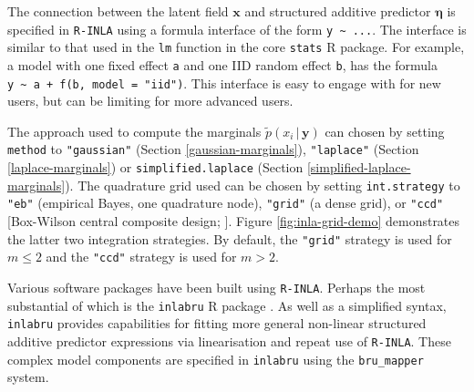 \documentclass[a4paper, nobind]{templates/ociamthesis}
\begin{document}
The connection between the latent field \(\mathbf{x}\) and structured additive predictor \(\boldsymbol{\mathbf{\eta}}\) is specified in \texttt{R-INLA} using a formula interface of the form \texttt{y\ \textasciitilde{}\ ...}.
The interface is similar to that used in the \texttt{lm} function in the core \texttt{stats} R package.
For example, a model with one fixed effect \texttt{a} and one IID random effect \texttt{b}, has the formula \texttt{y\ \textasciitilde{}\ a\ +\ f(b,\ model\ =\ "iid")}.
This interface is easy to engage with for new users, but can be limiting for more advanced users.

The approach used to compute the marginals \(\tilde p(x_i \, | \, \mathbf{y})\) can chosen by setting \texttt{method} to \texttt{"gaussian"} (Section \ref{gaussian-marginals}), \texttt{"laplace"} (Section \ref{laplace-marginals}) or \texttt{simplified.laplace} (Section \ref{simplified-laplace-marginals}).
The quadrature grid used can be chosen by setting \texttt{int.strategy} to \texttt{"eb"} (empirical Bayes, one quadrature node), \texttt{"grid"} (a dense grid), or \texttt{"ccd"} {[}Box-Wilson central composite design; \textcite{box1992experimental}{]}.
Figure \ref{fig:inla-grid-demo} demonstrates the latter two integration strategies.
By default, the \texttt{"grid"} strategy is used for \(m \leq 2\) and the \texttt{"ccd"} strategy is used for \(m > 2\).

Various software packages have been built using \texttt{R-INLA}.
Perhaps the most substantial of which is the \texttt{inlabru} R package \autocite{bachl2019inlabru}.
As well as a simplified syntax, \texttt{inlabru} provides capabilities for fitting more general non-linear structured additive predictor expressions via linearisation and repeat use of \texttt{R-INLA}.
These complex model components are specified in \texttt{inlabru} using the \texttt{bru\_mapper} system.
\end{document}
